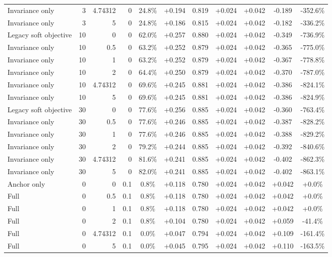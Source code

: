 \begin{table}[htbp]
\begin{tabular}{lrrrccccccc}
Invariance only & 3 & 4.74312 & 0 & 24.8\% & +0.194 & 0.819 & +0.024 & +0.042 & -0.189 & -352.6\% \\
Invariance only & 3 & 5 & 0 & 24.8\% & +0.186 & 0.815 & +0.024 & +0.042 & -0.182 & -336.2\% \\
Legacy soft objective & 10 & 0 & 0 & 62.0\% & +0.257 & 0.880 & +0.024 & +0.042 & -0.349 & -736.9\% \\
Invariance only & 10 & 0.5 & 0 & 63.2\% & +0.252 & 0.879 & +0.024 & +0.042 & -0.365 & -775.0\% \\
Invariance only & 10 & 1 & 0 & 63.2\% & +0.252 & 0.879 & +0.024 & +0.042 & -0.367 & -778.8\% \\
Invariance only & 10 & 2 & 0 & 64.4\% & +0.250 & 0.879 & +0.024 & +0.042 & -0.370 & -787.0\% \\
Invariance only & 10 & 4.74312 & 0 & 69.6\% & +0.245 & 0.881 & +0.024 & +0.042 & -0.386 & -824.1\% \\
Invariance only & 10 & 5 & 0 & 69.6\% & +0.245 & 0.881 & +0.024 & +0.042 & -0.386 & -824.9\% \\
Legacy soft objective & 30 & 0 & 0 & 77.6\% & +0.256 & 0.885 & +0.024 & +0.042 & -0.360 & -763.4\% \\
Invariance only & 30 & 0.5 & 0 & 77.6\% & +0.246 & 0.885 & +0.024 & +0.042 & -0.387 & -828.2\% \\
Invariance only & 30 & 1 & 0 & 77.6\% & +0.246 & 0.885 & +0.024 & +0.042 & -0.388 & -829.2\% \\
Invariance only & 30 & 2 & 0 & 79.2\% & +0.244 & 0.885 & +0.024 & +0.042 & -0.392 & -840.6\% \\
Invariance only & 30 & 4.74312 & 0 & 81.6\% & +0.241 & 0.885 & +0.024 & +0.042 & -0.402 & -862.3\% \\
Invariance only & 30 & 5 & 0 & 82.0\% & +0.241 & 0.885 & +0.024 & +0.042 & -0.402 & -863.1\% \\
Anchor only & 0 & 0 & 0.1 & 0.8\% & +0.118 & 0.780 & +0.024 & +0.042 & +0.042 & +0.0\% \\
Full & 0 & 0.5 & 0.1 & 0.8\% & +0.118 & 0.780 & +0.024 & +0.042 & +0.042 & +0.0\% \\
Full & 0 & 1 & 0.1 & 0.8\% & +0.118 & 0.780 & +0.024 & +0.042 & +0.042 & +0.0\% \\
Full & 0 & 2 & 0.1 & 0.8\% & +0.104 & 0.780 & +0.024 & +0.042 & +0.059 & -41.4\% \\
Full & 0 & 4.74312 & 0.1 & 0.0\% & +0.047 & 0.794 & +0.024 & +0.042 & +0.109 & -161.4\% \\
Full & 0 & 5 & 0.1 & 0.0\% & +0.045 & 0.795 & +0.024 & +0.042 & +0.110 & -163.5\% \\

\end{tabular}
\end{table}
